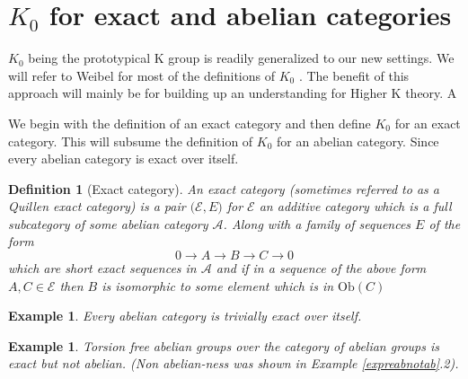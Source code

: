 \documentclass[12pt]{report}
\numberwithin{equation}{section}
\newcommand{\Z}{\mathbb{Z}}
\newtheorem{theorem}[dummy]{Theorem}
\newtheorem{definition}[dummy]{Definition}
\newtheorem{lemma}[dummy]{Lemma}
\newtheorem{example}[dummy]{Example}
\begin{document}
%	

\section{$K_0$ for exact and abelian categories}
	$K_0$ being the prototypical K group is readily generalized to our new settings. We will refer to Weibel for most of the definitions of $K_0$ \cite{weibel2013k}. The benefit of this approach will mainly be for building up an understanding for Higher K theory. A
	
	We begin with the definition of an exact category and then define $K_0$ for an exact category. This will subsume the definition of $K_0$ for an abelian category. Since every abelian category is exact over itself.
	
	\begin{definition}[Exact category]
		An exact category (sometimes referred to as a Quillen exact category) is a pair $\mathcal{(E},E)$ for $\mathcal{E}$ an additive category which is a full subcategory of some abelian category $\mathcal{A}$. Along with a family of sequences $E$ of the form \[ 0 \to A \to B \to C \to 0 \] which are short exact sequences in $\mathcal{A}$ and if in a sequence of the above form $A, C \in \mathcal{E}$ then $B $ is isomorphic to some element which is in $\mathrm{Ob}(C)$
	\end{definition}
	\begin{example}
		Every abelian category is trivially exact over itself.
	\end{example}
	\begin{example}Torsion free abelian groups over the category of abelian groups is exact but not abelian. (Non abelian-ness was shown in Example \ref{expreabnotab}.2).
	\end{example}
	
\end{document}
